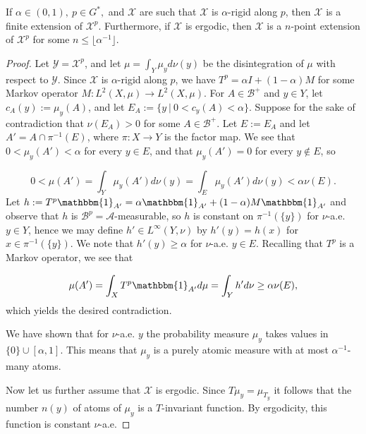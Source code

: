\documentclass[graybox]{svmult}
\theoremstyle{definition}
\begin{document}
\begin{theorem}\label{thm:PartiallyRigidFiniteFibers}
    If $\alpha \in (0,1),\ p \in G^*,$ and $\mathcal{X}$ are such that $\mathcal{X}$ is $\alpha$-rigid along $p$, then $\mathcal{X}$ is a finite extension of $\mathcal{X}^p$.
    Furthermore, if $\mathcal{X}$ is ergodic, then $\mathcal{X}$ is a $n$-point extension of $\mathcal{X}^p$ for some $n \le \lfloor\alpha^{-1}\rfloor$.
\end{theorem}

\begin{proof}
    Let $\mathcal{Y} = \mathcal{X}^p$, and let $\mu = \int_Y\mu_yd\nu(y)$ be the disintegration of $\mu$ with respect to $\mathcal{Y}$.
    Since $\mathcal{X}$ is $\alpha$-rigid along $p$, we have $T^p = \alpha I+(1-\alpha)M$ for some Markov operator $M:L^2(X,\mu)\rightarrow L^2(X,\mu)$.
    For $A \in \mathscr{B}^+$ and $y \in Y$, let $c_A(y) := \mu_y(A)$, and let $E_A := \{y\ |\ 0 < c_y(A) < \alpha\}$.
    Suppose for the sake of contradiction that $\nu(E_A) > 0$ for some $A \in \mathscr{B}^+$.
    Let $E := E_A$ and let $A' = A\cap\pi^{-1}(E)$, where $\pi:X\rightarrow Y$ is the factor map.
    We see that $0 < \mu_y(A') < \alpha$ for every $y \in E$, and that $\mu_y(A') = 0$ for every $y \notin E$, so

    \begin{equation}
        0 < \mu(A') = \int_Y\mu_y(A')d\nu(y) = \int_E\mu_y(A')d\nu(y) < \alpha\nu(E).
    \end{equation}
    Let $h := T^p\mathbbm{1}_{A'} = \alpha\mathbbm{1}_{A'}+(1-\alpha)M\mathbbm{1}_{A'}$ and observe that $h$ is $\mathscr{B}^p = \mathscr{A}$-measurable, so $h$ is constant on $\pi^{-1}(\{y\})$ for $\nu$-a.e. $y \in Y$, hence we may define $h' \in L^\infty(Y,\nu)$ by $h'(y) = h(x)$ for $x \in \pi^{-1}(\{y\})$.
    We note that $h'(y) \ge \alpha$ for $\nu$-a.e. $y \in E$.
    Recalling that $T^p$ is a Markov operator, we see that

    \begin{equation}
        \mu(A') = \int_XT^p\mathbbm{1}_{A'}d\mu = \int_Yh'd\nu \ge \alpha\nu(E), 
    \end{equation}
    which yields the desired contradiction.

    We have shown that for $\nu$-a.e. $y$ the probability measure $\mu_y$ takes values in $\{0\}\cup[\alpha,1]$.
    This means that $\mu_y$ is a purely atomic measure with at most $\alpha^{-1}$-many atoms.

    Now let us further assume that $\mathcal{X}$ is ergodic. Since $T\mu_y=\mu_{T_y}$ it follows that the number $n(y)$ of atoms of $\mu_y$ is a $T$-invariant function.
    By ergodicity, this function is constant $\nu$-a.e.
\end{proof}
\end{document}
